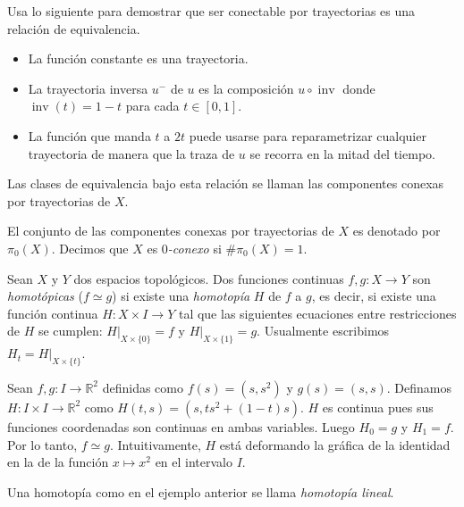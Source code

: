 \documentclass{standalone}
\begin{document}
	
	\begin{exercise}\label{ex:connected_comp}
		Usa lo siguiente para demostrar que ser conectable por trayectorias es una relación de equivalencia.
		\begin{itemize}
			\item La función constante es una trayectoria.
			\item La trayectoria inversa $u^{-}$ de $u$ es la composición $u\circ \operatorname{inv}$ donde $\operatorname{inv}(t) = 1-t$ para cada $t\in[0,1]$.
			\item La función que manda $t$ a $2t$ puede usarse para reparametrizar cualquier trayectoria de manera que la traza de $u$ se recorra en la mitad del tiempo.
		\end{itemize}
		Las clases de equivalencia bajo esta relación se llaman las componentes conexas por trayectorias de $X$.
	\end{exercise}
	
	\begin{definition}\label{defn:0_connected}
		El conjunto de las componentes conexas por trayectorias de $X$ es denotado por $\pi_{0}(X)$. Decimos que $X$ es \emph{$0$-conexo} si $\#\pi_{0}(X)=1$.
	\end{definition}
	
	
	\begin{definition}\label{defn:homotopy}
		Sean $X$ y $Y$ dos espacios topológicos. Dos funciones continuas $f,g\colon X\rightarrow Y$ son \emph{homotópicas} ($f\simeq g$) si existe una \emph{homotopía} $H$ de $f$ a $g$, es decir, si existe una función continua $H\colon X\times I\rightarrow Y$ tal que las siguientes ecuaciones entre restricciones de $H$ se cumplen: $H|_{X\times\{0\}}=f$ y $H|_{X\times\{1\}}=g$. Usualmente escribimos $H_{t}=H|_{X\times\{t\}}$.
	\end{definition}
	
	\begin{example}
		Sean $f,g\colon I\rightarrow\mathbb{R}^{2}$ definidas como $f(s) = (s,s^{2})$ y $g(s)=(s,s)$. Definamos $H\colon I\times I\rightarrow\mathbb{R}^{2}$ como $H(t,s) = (s, ts^{2}+(1-t)s)$. $H$ es continua pues sus funciones coordenadas son continuas en ambas variables. Luego $H_{0} = g$ y $H_{1} = f$. Por lo tanto, $f\simeq g$. Intuitivamente, $H$ está deformando la gráfica de la identidad en la de la función $x\mapsto x^{2}$ en el intervalo $I$.
	\end{example}
	
	\begin{definition}
		Una homotopía como en el ejemplo anterior se llama \emph{homotopía lineal}.
	\end{definition}
	
\end{document}
